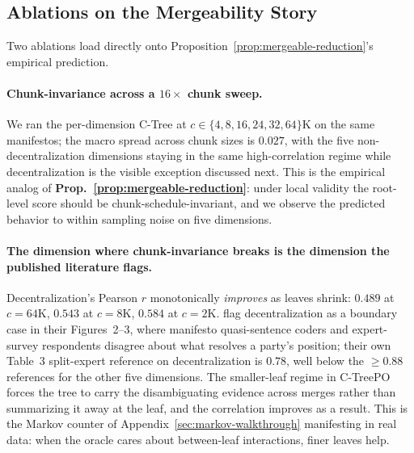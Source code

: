\subsection{Ablations on the Mergeability Story}

Two ablations load directly onto Proposition~\ref{prop:mergeable-reduction}'s
empirical prediction.

\paragraph{Chunk-invariance across a $16\times$ chunk sweep.} We ran
the per-dimension C-Tree at $c\in\{4,8,16,24,32,64\}\mathrm{K}$ on the
same manifestos; the macro spread across chunk sizes is $0.027$, with
the five non-decentralization dimensions staying in the same
high-correlation regime while decentralization is the visible exception
discussed next. This is the empirical
analog of \textbf{Prop.~\ref{prop:mergeable-reduction}}: under local
validity the root-level score should be chunk-schedule-invariant, and
we observe the predicted behavior to within sampling noise on five
dimensions.

\paragraph{The dimension where chunk-invariance breaks is the
dimension the published literature flags.} Decentralization's
Pearson $r$ monotonically \emph{improves} as leaves shrink: $0.489$
at $c = 64\mathrm{K}$, $0.543$ at $c = 8\mathrm{K}$, $0.584$ at
$c = 2\mathrm{K}$. \citet{BenoitEtAl2025} flag decentralization as a
boundary case in their Figures~2--3, where manifesto quasi-sentence
coders and expert-survey respondents disagree about what
          resolves a party's position; their own Table~3 split-expert
          reference on decentralization is $0.78$, well below the
          $\ge 0.88$ references for the other five dimensions. The smaller-leaf regime in
C-TreePO forces the tree to carry the disambiguating evidence across
merges rather than summarizing it away at the leaf, and the
correlation improves as a result. This is the Markov counter of
Appendix~\ref{sec:markov-walkthrough} manifesting in real data: when
the oracle cares about between-leaf interactions, finer leaves help.

